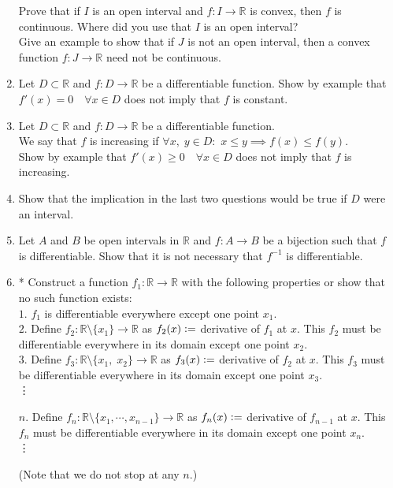 \documentclass{article}
\begin{document}
\begin{enumerate}
	Prove that if $I$ is an open interval and $f:I\to\mathbb{R}$ is convex, then $f$ is continuous. Where did you use that $I$ is an open interval?\\
	Give an example to show that if $J$ is not an open interval, then a convex function $f:J\to\mathbb{R}$ need not be continuous.
	\item Let $D \subset \mathbb{R}$ and $f:D\to\mathbb{R}$ be a differentiable function. Show by example that $f'(x) = 0 \quad \forall x \in D$ does not imply that $f$ is constant.
	\item Let $D \subset \mathbb{R}$ and $f:D\to\mathbb{R}$ be a differentiable function.\\
	We say that $f$ is increasing if $\forall x,\;y \in D:$ $x \le y \implies f(x) \le f(y).$\\
	Show by example that $f'(x) \ge 0 \quad \forall x\in D$ does not imply that $f$ is increasing.
	\item Show that the implication in the last two questions would be true if $D$ were an interval.
	\item Let $A$ and $B$ be open intervals in $\mathbb{R}$ and $f:A\to B$ be a bijection such that $f$ is differentiable. Show that it is not necessary that $f^{-1}$ is differentiable.
	\item * Construct a function $f_1:\mathbb{R}\to\mathbb{R}$ with the following properties or show that no such function exists:\\
	$1.$ $f_1$ is differentiable everywhere except one point $x_1.$\\
	$2.$ Define $f_2 : \mathbb{R}\setminus\{x_1\} \to \mathbb{R}$ as $f_2(x) \vcentcolon= $ derivative of $f_1$ at $x.$ This $f_2$ must be differentiable everywhere in its domain except one point $x_2.$\\
	$3.$ Define $f_3 : \mathbb{R}\setminus\{x_1,\;x_2\} \to \mathbb{R}$ as $f_3(x) \vcentcolon= $ derivative of $f_2$ at $x.$ This $f_3$ must be differentiable everywhere in its domain except one point $x_3.$\\
	\vdots

	$n.$ Define $f_n : \mathbb{R}\setminus\{x_1, \cdots, x_{n-1}\} \to \mathbb{R}$ as $f_n(x) \vcentcolon= $ derivative of $f_{n-1}$ at $x.$ This $f_n$ must be differentiable everywhere in its domain except one point $x_n.$\\
	\vdots

	(Note that we do not stop at any $n.$) 
\end{enumerate}
\end{document}
